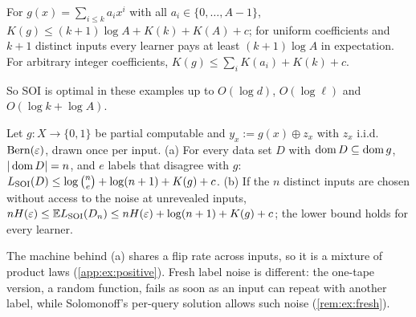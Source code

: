 \begin{example}\label{ex:ex:poly}
For $g(x)=\sum_{i\le k}a_ix^i$ with all $a_i\in\{0,\dots,A-1\}$, $K(g)\le(k+1)\log A+K(k)+K(A)+c$; for uniform coefficients and $k+1$ distinct inputs every learner pays at least $(k+1)\log A$ in expectation. For arbitrary integer coefficients, $K(g)\le\sum_iK(a_i)+K(k)+c$.
\end{example}

So SOI is optimal in these examples up to $O(\log d)$, $O(\log\ell)$ and $O(\log k+\log A)$.

\begin{proposition}\label{prop:ex:frozen}
Let $g:X\to\{0,1\}$ be partial computable and $y_x:=g(x)\oplus z_x$ with $z_x$ i.i.d.\ $\operatorname{Bern}(\varepsilon)$, drawn once per input.
(a) For every data set $D$ with $\operatorname{dom} D\subseteq\operatorname{dom} g$, $|\operatorname{dom} D|=n$, and $e$ labels that disagree with $g$: $L_{\mathrm{SOI}}(D)\le\log\binom ne+\log(n+1)+K(g)+c$.
(b) If the $n$ distinct inputs are chosen without access to the noise at unrevealed inputs, $nH(\varepsilon)\le\mathbb{E}L_{\mathrm{SOI}}(D_n)\le nH(\varepsilon)+\log(n+1)+K(g)+c$; the lower bound holds for every learner.
\end{proposition}

The machine behind (a) shares a flip rate across inputs, so it is a mixture of product laws (\cref{app:ex:positive}). Fresh label noise is different: the one-tape version, a random function, fails as soon as an input can repeat with another label, while Solomonoff's per-query solution allows such noise (\cref{rem:ex:fresh}).


